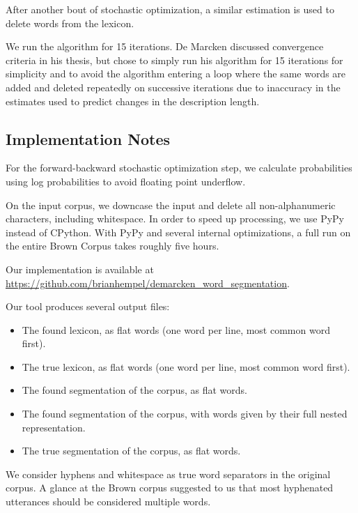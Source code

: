 \documentclass[11pt, oneside, fleqn]{article}
\begin{document}
  After another bout of stochastic optimization, a similar estimation is used to delete words from the lexicon.

  We run the algorithm for 15 iterations. De Marcken discussed convergence criteria in his thesis, but chose to simply run his algorithm for 15 iterations for simplicity and to avoid the algorithm entering a loop where the same words are added and deleted repeatedly on successive iterations due to inaccuracy in the estimates used to predict changes in the description length.

  \subsection{Implementation Notes}

  For the forward-backward stochastic optimization step, we calculate probabilities using log probabilities to avoid floating point underflow.

  On the input corpus, we downcase the input and delete all non-alphanumeric characters, including whitespace. In order to speed up processing, we use PyPy instead of CPython. With PyPy and several internal optimizations, a full run on the entire Brown Corpus takes roughly five hours.

  Our implementation is available at \href{https://github.com/brianhempel/demarcken_word_segmentation}{\underline{https://github.com/brianhempel/demarcken\_word\_segmentation}}.

  Our tool produces several output files:

  \begin{itemize}
    \item The found lexicon, as flat words (one word per line, most common word first).
    \item The true lexicon, as flat words (one word per line, most common word first).
    \item The found segmentation of the corpus, as flat words.
    \item The found segmentation of the corpus, with words given by their full nested representation.
    \item The true segmentation of the corpus, as flat words.
  \end{itemize}

	We consider hyphens and whitespace as true word separators in the original corpus. A glance at the Brown corpus suggested to us that most hyphenated utterances should be considered multiple words.
\end{document}
